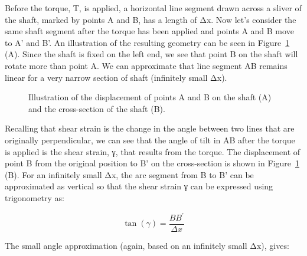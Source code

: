 \documentclass[
  letterpaper,
  DIV=11,
  numbers=noendperiod]{scrreprt}
\theoremstyle{definition}
\theoremstyle{remark}
\begin{document}
Before the torque, T, is applied, a horizontal line segment drawn across
a sliver of the shaft, marked by points A and B, has a length of Δx. Now
let's consider the same shaft segment after the torque has been applied
and points A and B move to A' and B'. An illustration of the resulting
geometry can be seen in Figure~\ref{fig-6.9} (A). Since the shaft is
fixed on the left end, we see that point B on the shaft will rotate more
than point A. We can approximate that line segment AB remains linear for
a very narrow section of shaft (infinitely small Δx).

\begin{figure}


\caption{\label{fig-6.9}Illustration of the displacement of points A and
B on the shaft (A) and the cross-section of the shaft (B).}

\end{figure}%

Recalling that shear strain is the change in the angle between two lines
that are originally perpendicular, we can see that the angle of tilt in
AB after the torque is applied is the shear strain, γ, that results from
the torque. The displacement of point B from the original position to B'
on the cross-section is shown in Figure~\ref{fig-6.9} (B). For an
infinitely small Δx, the arc segment from B to B' can be approximated as
vertical so that the shear strain γ can be expressed using trigonometry
as:

\[
\tan (\gamma)=\frac{B B^{\prime}}{\Delta x}
\]

The small angle approximation (again, based on an infinitely small Δx),
gives:
\end{document}
